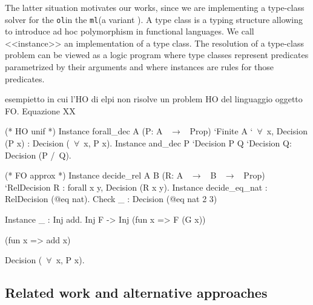 \documentclass[sigconf,natbib=false]{acmart}
\def\elpi{\proglang{elpi}}
\def\lambdaprolog{\proglang{$\lambda$-prolog}}
\def\coq{\proglang{coq}}
\newcommand*{\acronym}[1]{\texttt{#1}\xspace}
\def\ol{\acronym{ol}} %
\def\ml{\acronym{ml}} %
\newcommand*{\eqtau}{\ensuremath{\mathrel{\overset{\mathrm{\tau}}{=}}}}
\begin{document}
The latter situation motivates our works, since we are implementing a type-class
solver for the \ol \coq in the \ml \elpi (a variant \lambdaprolog). A type class
\cite{wadler89, sozeau08} is a typing structure allowing to introduce ad hoc
polymorphism in functional languages. We call <<instance>> an implementation of
a type class. The resolution of a type-class problem can be viewed as a logic
program where type classes represent predicates parametrized by their arguments
and where instances are rules for those predicates. 





esempietto in cui l'HO di elpi non risolve un problem HO del linguaggio
oggetto FO. Equazione XX


\begin{coqcode}
(* HO unif *)
Instance forall_dec A (P: A ~$\to$~ Prop) `{Finite A} `{~$\forall$~x, Decision (P x)} :
  Decision (~$\forall$~x, P x).
Instance and_dec P `{Decision P} Q `{Decision Q}:  Decision (P /\ Q).



(* FO approx *)
Instance decide_rel A B (R: A ~$\to$~ B ~$\to$~ Prop) `{RelDecision R} :
  forall x y, Decision (R x y).
Instance decide_eq_nat : RelDecision (@eq nat).
Check _ : Decision (@eq nat 2 3)


Instance _ : Inj add.
             Inj F -> Inj (fun x => F (G x))

             (fun x => add x)


  Decision (~$\forall$~x, P x).

\end{coqcode}

\subsection{Related work and alternative approaches}
\end{document}
